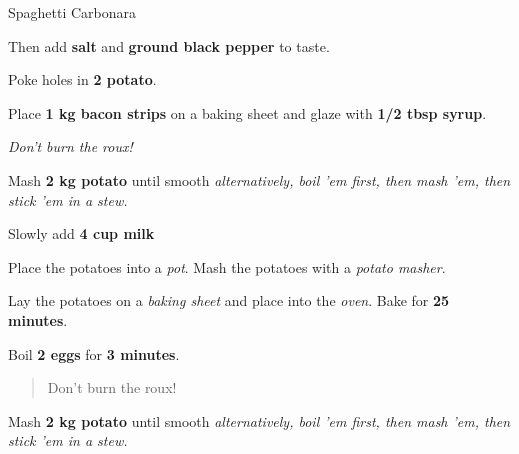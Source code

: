 \begin{recipe}{Spaghetti Carbonara}{}

Then add \textbf{salt} and \textbf{ground black pepper} to taste.

\vspace{1em}


Poke holes in \textbf{2 potato}.

\vspace{1em}


Place \textbf{1 kg bacon strips} on a baking sheet and glaze with \textbf{1/2 tbsp syrup}.

\vspace{1em}


\textit{Don't burn the roux!}

\vspace{1em}


Mash \textbf{2 kg potato} until smooth \textit{alternatively, boil 'em first, then mash 'em, then stick 'em in a stew.}

\vspace{1em}


Slowly add \textbf{4 cup milk}%

\vspace{1em}


Place the potatoes into a \textit{pot}.
Mash the potatoes with a \textit{potato masher}.

\vspace{1em}


Lay the potatoes on a \textit{baking sheet} and place into the \textit{oven}. Bake for \textbf{25 minutes}.

\vspace{1em}


Boil \textbf{2 eggs} for \textbf{3 minutes}.

\vspace{1em}


\begin{quote}
Don't burn the roux!
\end{quote}

\vspace{1em}


Mash \textbf{2 kg potato} until smooth \textit{alternatively, boil 'em first, then mash 'em, then stick 'em in a stew.}


\end{recipe}
